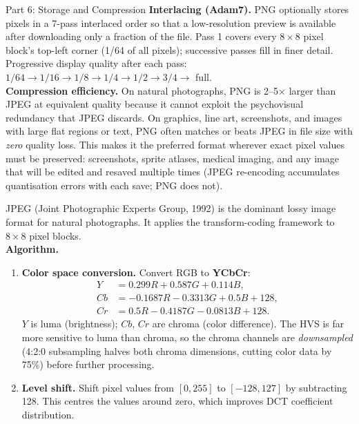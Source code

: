 \documentclass[letterpaper]{article}
\begin{document}
\begin{notes}{Part 6: Storage and Compression}
\textbf{Interlacing (Adam7).} PNG optionally stores pixels in a 7-pass interlaced order so that a low-resolution preview is available after downloading only a fraction of the file. Pass 1 covers every $8\times8$ pixel block's top-left corner (1/64 of all pixels); successive passes fill in finer detail. Progressive display quality after each pass: $1/64 \to 1/16 \to 1/8 \to 1/4 \to 1/2 \to 3/4 \to$ full.\\

\textbf{Compression efficiency.} On natural photographs, PNG is 2--5$\times$ larger than JPEG at equivalent quality because it cannot exploit the psychovisual redundancy that JPEG discards. On graphics, line art, screenshots, and images with large flat regions or text, PNG often matches or beats JPEG in file size with \emph{zero} quality loss. This makes it the preferred format wherever exact pixel values must be preserved: screenshots, sprite atlases, medical imaging, and any image that will be edited and resaved multiple times (JPEG re-encoding accumulates quantisation errors with each save; PNG does not).


JPEG (Joint Photographic Experts Group, 1992) is the dominant lossy image format for natural photographs. It applies the transform-coding framework to $8\times8$ pixel blocks.\\

\textbf{Algorithm.}

\begin{enumerate}
    \item \textbf{Color space conversion.} Convert RGB to \textbf{YCbCr}:
    \begin{align*}
    Y  &= 0.299R + 0.587G + 0.114B,\\
    Cb &= -0.1687R - 0.3313G + 0.5B + 128,\\
    Cr &= 0.5R - 0.4187G - 0.0813B + 128.
    \end{align*}
    $Y$ is luma (brightness); $Cb$, $Cr$ are chroma (color difference). The HVS is far more sensitive to luma than chroma, so the chroma channels are \emph{downsampled} (4:2:0 subsampling halves both chroma dimensions, cutting color data by 75\%) before further processing.
    
    \item \textbf{Level shift.} Shift pixel values from $[0, 255]$ to $[-128, 127]$ by subtracting 128. This centres the values around zero, which improves DCT coefficient distribution.
    

\end{enumerate}
\end{notes}
\end{document}
